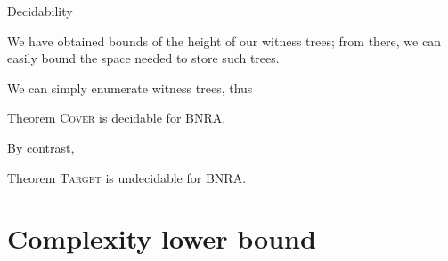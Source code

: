 \documentclass{beamer}
\newcommand{\COVER}{\textsc{Cover}}
\newcommand{\TARGET}{\textsc{Target}}
\begin{document}
				
				
		
			
				
				
			
	

\begin{frame}{Decidability}
	
	We have obtained bounds of the height of our witness trees; from there, we can easily bound the space needed to store such trees.
	
	\pause
	We can simply enumerate witness trees, thus
	
	\begin{block}{Theorem}
		{\COVER{}} is decidable for BNRA.
	\end{block}
	
	\pause
	
	By contrast,
	
	\begin{block}{Theorem}
		{\TARGET{}} is undecidable for BNRA.
	\end{block}
\end{frame}

\section{Complexity lower bound}
\end{document}
